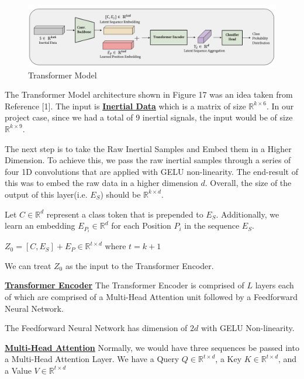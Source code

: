\documentclass[conference]{IEEEtran}
\begin{document}
\begin{figure}[h!]
	\includegraphics[width= 0.9 \linewidth]{imu_model.png}
	\centering
	\caption{Transformer Model}
	\label{imu_model.png}
\end{figure}

The Transformer Model architecture shown in Figure 17 was an idea taken from Reference [1]. The input is \underline{\textbf{Inertial Data}} which is a matrix of size $\mathbb{R}^{k \times 6}$. In our project case, since we had a total of 9 inertial signals, the input would be of size $\mathbb{R}^{k \times 9}$. \newline 

The next step is to take the Raw Inertial Samples and Embed them in a Higher Dimension. To achieve this, we pass the raw inertial samples through a series of four 1D convolutions that are applied with GELU non-linearity. The end-result of this was to embed the raw data in a higher dimension $d$. Overall, the size of the output of this layer(i.e. $E_S$) should be $\mathbb{R}^{k \times d}$. \newline 

Let $C \in \mathbb{R}^{d}$ represent a class token that is prepended to $E_S$. Additionally, we learn an embedding $E_{P_i} \in \mathbb{R}^d$ for each Position $P_i$ in the sequence $E_S$. 


$Z_0 = [C, E_S] + E_P \in \mathbb{R}^{t \times d}$
where $t = k + 1$  

We can treat $Z_0$ as the input to the Transformer Encoder. \newline 

\textbf{\underline{Transformer Encoder}} \newline 
The Transformer Encoder is comprised of $L$ layers each of which are comprised of a Multi-Head Attention unit followed by a Feedforward Neural Network. \newline 

The Feedforward Neural Network has dimension of $2d$ with GELU Non-linearity. \newline 

\textbf{\underline{Multi-Head Attention}} \newline
Normally, we would have three sequences be passed into a Multi-Head Attention Layer. We have a Query $Q \in \mathbb{R}^{t \times d}$, a Key $K \in \mathbb{R}^{t \times d}$, and a Value $V \in \mathbb{R}^{t \times d}$ \newline 
\end{document}
